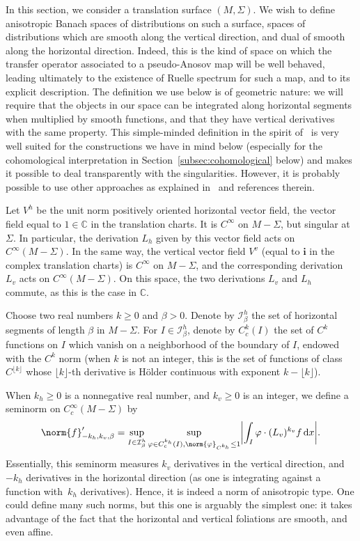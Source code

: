\documentclass[JEP,XML,SOM,Unicode]{cedram}
\newcommand{\boI}{\mathcal{I}}
\newcommand{\CC}{\mathbb{C}}
\newcommand{\dd}{\mathop{}\!\mathrm{d}}
\newcommand{\ic}{\mathbf{i}}
\newcommand{\absgg}[1]{\biggl \lvert#1\biggr\rvert}
\let\phi\varphi
\theoremstyle{definition}
\numberwithin{equation}{section}
\begin{document}
In this section, we consider a translation surface $(M, \Sigma)$. We wish to
define anisotropic Banach spaces of distributions on such a surface, \ie spaces of distributions which are smooth along the vertical direction, and
dual of smooth along the horizontal direction. Indeed, this is the kind of
space on which the transfer operator associated to a pseudo-Anosov map will
be well behaved, leading ultimately to the existence of Ruelle spectrum for
such a map, and to its explicit description. The definition we use below is
of geometric nature: we will require that the objects in our space can be
integrated along horizontal segments when multiplied by smooth functions, and
that they have vertical derivatives with the same property. This
simple-minded definition in the spirit of~\cite{GL_Anosov2, avila_gouezel} is
very well suited for the constructions we have in mind below (especially for
the cohomological interpretation in Section~\ref{subsec:cohomological}
below) and makes it possible to deal transparently with the singularities.
However, it is probably possible to use other approaches as explained
in~\cite{baladi_ultimate} and references therein.

Let $V^h$ be the unit norm positively oriented horizontal vector field, \ie the vector field equal to $1 \in \CC$ in the translation charts. It is
$C^\infty$ on $M-\Sigma$, but singular at $\Sigma$. In particular, the
derivation $L_h$ given by this vector field acts on $C^\infty(M-\Sigma)$. In
the same way, the vertical vector field $V^v$ (equal to $\ic$ in the complex
translation charts) is $C^\infty$ on $M-\Sigma$, and the corresponding
derivation $L_v$ acts on $C^\infty(M-\Sigma)$. On this space, the two
derivations $L_v$ and $L_h$ commute, as this is the case in $\CC$.

Choose two real numbers $k\geq 0$ and $\beta >0$. Denote by $\boI^h_\beta$
the set of horizontal segments of length $\beta$ in $M-\Sigma$. For $I\in
\boI^h_\beta$, denote by $C^k_c(I)$ the set of $C^k$ functions on $I$ which
vanish on a neighborhood of the boundary of $I$, endowed with the $C^k$ norm
(when $k$ is not an integer, this is the set of functions of class
$C^{\lfloor k \rfloor}$ whose $\lfloor k \rfloor$-th derivative is Hölder
continuous with exponent $k-\lfloor k \rfloor$).

When $k_h\geq 0$ is a nonnegative real number, and $k_v\geq 0$ is an integer,
we define a seminorm on $C^\infty_c(M-\Sigma)$ by
\begin{equation*}
\norm{f}'_{-k_h, k_v, \beta} =
\sup_{I \in \boI^h_\beta} \sup_{\phi \in C^{k_h}_c(I),
\norm{\phi}_{C^{k_h}} \leq 1} \absgg{\int_I \phi \cdot (L_v)^{k_v} f \dd x}.
\end{equation*}
Essentially, this seminorm measures $k_v$ derivatives in the vertical
direction, and $-k_h$ derivatives in the horizontal direction (as one is
integrating against a function with~$k_h$ derivatives). Hence, it is indeed a
norm of anisotropic type. One could define many such norms, but this one is
arguably the simplest one: it takes advantage of the fact that the horizontal
and vertical foliations are smooth, and even affine.
\end{document}
